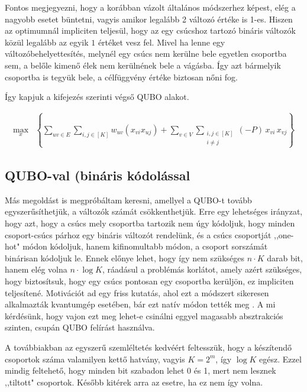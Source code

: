 Fontos megjegyezni, hogy a korábban vázolt általános módszerhez képest, elég a nagyobb esetet büntetni, vagyis amikor legalább 2 változó értéke is 1-es. Hiszen az optimumnál impliciten teljesül, hogy az egy csúcshoz tartozó bináris változók közül legalább az egyik $1$ értéket vesz fel. Mivel ha lenne egy változóbehelyettesítés, melynél egy csúcs nem kerülne bele egyetlen csoportba sem, a belőle kimenő élek nem kerülnének bele a vágásba. Így azt bármelyik csoportba is tegyük bele, a célfüggvény értéke biztosan nőni fog.

Így kapjuk a  kifejezés szerinti végső QUBO alakot.



\begin{align} 
	\max_{x} & \left\{ \sum _{uv \in E}  \sum _{i,j\in [K]} w_{uv}(x_{vi}  x_{uj}) + \sum _{v \in V } \sum _{\substack{ i,j \in [K] \\  i \neq j}} (-P) \, x_{vi} \, x_{vj}\right\} 
	\label{QUBOOnehot}
\end{align}


\subsection{QUBO-val (bináris kódolással}\label{sec:QUBObinary}

Más megoldást is megpróbáltam keresni, amellyel a QUBO-t tovább egyszerűsíthetjük, a változók számát csökkenthetjük. Erre egy lehetséges irányzat, hogy azt, hogy a csúcs mely csoportba tartozik nem úgy kódoljuk, hogy minden csoport-csúcs párhoz egy bináris változót rendelünk, és a csúcs csoportját ,,one-hot" módon kódoljuk, hanem kifinomultabb módon, a csoport sorszámát binárisan kódoljuk le. Ennek előnye lehet, hogy így nem szükséges $n \cdot K$ darab bit, hanem elég volna $n \cdot \log K$, ráadásul a problémás korlátot, amely azért szükséges, hogy biztosítsuk, hogy egy csúcs pontosan egy csoportba kerüljön, ez impliciten teljesítené. Motivációt ad egy friss kutatás, ahol ezt a módszert sikeresen alkalmazták kvantumgép esetében, bár ezt natív módon tették meg  \cite{fuchs2020efficient}. A mi kérdésünk, hogy vajon ezt meg lehet-e csinálni eggyel magasabb absztrakciós szinten, csupán QUBO felírást használva.

A továbbiakban az egyszerű szemléltetés kedvéért feltesszük, hogy a készítendő csoportok száma valamilyen kettő hatvány, vagyis $K=2^m$, így $\log K$ egész. Ezzel mindig feltehető, hogy minden bit szabadon lehet 0 és 1, mert nem lesznek ,,tiltott" csoportok. Később kitérek arra az esetre, ha ez nem így volna.

